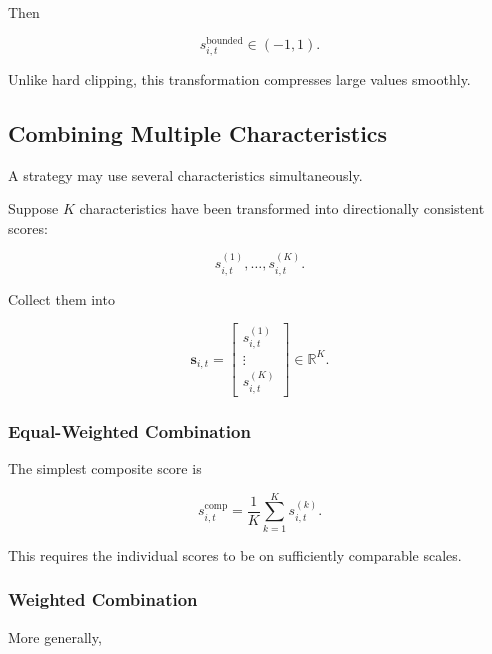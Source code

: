 \documentclass[11pt,a4paper]{article}
\begin{document}
Then

\begin{equation}
s_{i,t}^{\mathrm{bounded}}
\in
(-1,1).
\end{equation}

Unlike hard clipping, this transformation compresses large values smoothly.


\subsection{Combining Multiple Characteristics}
\label{subsec:combining_characteristics}

A strategy may use several characteristics simultaneously.

Suppose $K$ characteristics have been transformed into directionally consistent
scores:

\begin{equation}
s_{i,t}^{(1)},
\ldots,
s_{i,t}^{(K)}.
\end{equation}

Collect them into

\begin{equation}
\mathbf{s}_{i,t}
=
\begin{bmatrix}
s_{i,t}^{(1)}
\\
\vdots
\\
s_{i,t}^{(K)}
\end{bmatrix}
\in
\mathbb{R}^{K}.
\end{equation}


\subsubsection{Equal-Weighted Combination}

The simplest composite score is

\begin{equation}
\boxed{
s_{i,t}^{\mathrm{comp}}
=
\frac{1}{K}
\sum_{k=1}^{K}
s_{i,t}^{(k)}.
}
\end{equation}

This requires the individual scores to be on sufficiently comparable scales.


\subsubsection{Weighted Combination}

More generally,
\end{document}
